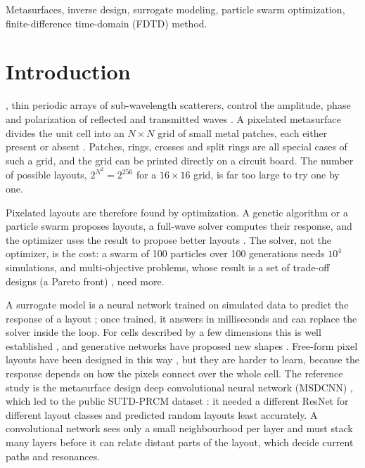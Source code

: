 \documentclass[journal]{IEEEtran}
\begin{document}
\begin{IEEEkeywords}
Metasurfaces, inverse design, surrogate modeling, particle swarm optimization, finite-difference time-domain (FDTD) method.
\end{IEEEkeywords}

\section{Introduction}
, thin periodic arrays of sub-wavelength scatterers, control the amplitude, phase and polarization of reflected and transmitted waves \cite{glybovski}. A pixelated metasurface divides the unit cell into an $N\times N$ grid of small metal patches, each either present or absent \cite{qiu_advsci,msdcnn}. Patches, rings, crosses and split rings are all special cases of such a grid, and the grid can be printed directly on a circuit board. The number of possible layouts, $2^{N^2}=2^{256}$ for a $16\times16$ grid, is far too large to try one by one.

Pixelated layouts are therefore found by optimization. A genetic algorithm \cite{jafar_ga} or a particle swarm \cite{kennedy,robinson} proposes layouts, a full-wave solver computes their response, and the optimizer uses the result to propose better layouts \cite{khatib_review}. The solver, not the optimizer, is the cost: a swarm of 100 particles over 100 generations needs $10^4$ simulations, and multi-objective problems, whose result is a set of trade-off designs (a Pareto front) \cite{nsga2}, need more.

A surrogate model is a neural network trained on simulated data to predict the response of a layout \cite{khatib_review}; once trained, it answers in milliseconds and can replace the solver inside the loop. For cells described by a few dimensions this is well established \cite{liu_tandem,nadell}, and generative networks have proposed new shapes \cite{liu_gan,ma_vae}. Free-form pixel layouts have been designed in this way \cite{qiu_advsci}, but they are harder to learn, because the response depends on how the pixels connect over the whole cell. The reference study is the metasurface design deep convolutional neural network (MSDCNN) \cite{msdcnn}, which led to the public SUTD-PRCM dataset \cite{sutd}: it needed a different ResNet \cite{resnet} for different layout classes and predicted random layouts least accurately. A convolutional network sees only a small neighbourhood per layer and must stack many layers before it can relate distant parts of the layout, which decide current paths and resonances.
\end{document}
